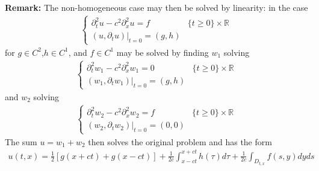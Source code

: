 \documentclass{article}
\newcommand{\R}{{\mathbb{R}}}
\newcommand{\pd}{\partial}
\begin{document}
	\textbf{Remark:} The non-homogeneous case may then be solved by linearity: in the case 
	\begin{align*}
		\begin{cases}
			\pd_{t}^{2}u - c^2 \pd_{x}^{2}u = f & \{t \geq 0\} \times \R \\
			(u, \pd_{t}u) |_{t=0} = (g,h)
		\end{cases}
	\end{align*}
	for $g \in C^{2}$,$h \in C^{1}$, and $f \in C^{1}$ may be solved by finding $w_1$ solving
	\begin{align*}
		\begin{cases}
			\pd_{t}^{2}w_1 - c^2 \pd_{x}^{2}w_1 = 0 & \{t \geq 0\} \times \R \\
			(w_1, \pd_{t}w_1) |_{t=0} = (g,h)
		\end{cases}
	\end{align*}
	and $w_2$ solving 
	\begin{align*}
		\begin{cases}
			\pd_{t}^{2}w_2 - c^2 \pd_{x}^{2}w_2 = f & \{t \geq 0\} \times \R \\
			(w_2, \pd_{t}w_2) |_{t=0} = (0,0)
		\end{cases}
	\end{align*}
	The sum $u = w_1 + w_2$ then solves the original problem and has the form 
	\begin{align*}
		u(t,x) = \frac{1}{2}\left[g(x+ct)+g(x-ct)  \right] + \frac{1}{2c} \int_{x-ct}^{x+ct} h(\tau) d\tau + \frac{1}{2c} \int_{D_{t,x}} f(s,y) dyds
	\end{align*}
	
\end{document}
